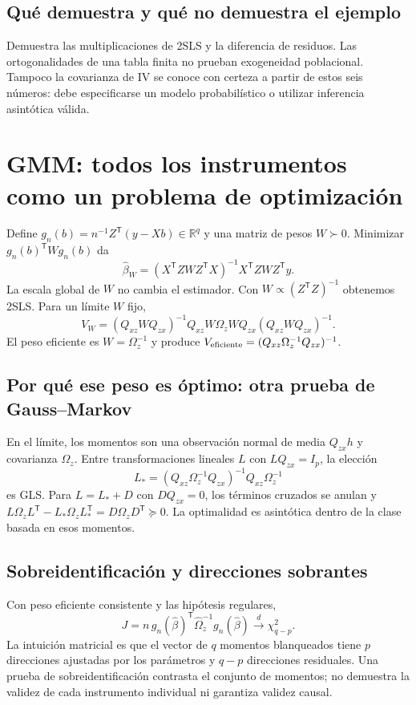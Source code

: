 \documentclass[11pt,a4paper]{article}
\newcommand{\R}{\mathbb R}
\newcommand{\T}{^{\mathsf T}}
\theoremstyle{definition}
\begin{document}
\subsection{Qué demuestra y qué no demuestra el ejemplo}
Demuestra las multiplicaciones de 2SLS y la diferencia de residuos. Las ortogonalidades de una tabla finita no prueban exogeneidad poblacional. Tampoco la covarianza de IV se conoce con certeza a partir de estos seis números: debe especificarse un modelo probabilístico o utilizar inferencia asintótica válida.

\section{GMM: todos los instrumentos como un problema de optimización}
Define $g_n(b)=n^{-1}Z\T(y-Xb)\in\R^q$ y una matriz de pesos $W\succ0$. Minimizar $g_n(b)\T Wg_n(b)$ da
\[
\widehat\beta_W=(X\T ZWZ\T X)^{-1}X\T ZWZ\T y.
\]
La escala global de $W$ no cambia el estimador. Con $W\propto(Z\T Z)^{-1}$ obtenemos 2SLS. Para un límite $W$ fijo,
\[
V_W=(Q_{xz}WQ_{zx})^{-1}Q_{xz}W\Omega_zWQ_{zx}(Q_{xz}WQ_{zx})^{-1}.
\]
El peso eficiente es $W=\Omega_z^{-1}$ y produce $V_{\rm eficiente}=(Q_{xz}\Omega_z^{-1}Q_{zx})^{-1}$.
\subsection{Por qué ese peso es óptimo: otra prueba de Gauss--Markov}
En el límite, los momentos son una observación normal de media $Q_{zx}h$ y covarianza $\Omega_z$. Entre transformaciones lineales $L$ con $LQ_{zx}=I_p$, la elección
\[
L_*=(Q_{xz}\Omega_z^{-1}Q_{zx})^{-1}Q_{xz}\Omega_z^{-1}
\]
es GLS. Para $L=L_*+D$ con $DQ_{zx}=0$, los términos cruzados se anulan y $L\Omega_zL\T-L_*\Omega_zL_*\T=D\Omega_zD\T\succeq0$. La optimalidad es asintótica dentro de la clase basada en esos momentos.
\subsection{Sobreidentificación y direcciones sobrantes}
Con peso eficiente consistente y las hipótesis regulares,
\[
J=n\,g_n(\widehat\beta)\T\widehat\Omega_z^{-1}g_n(\widehat\beta)
\xrightarrow d\chi^2_{q-p}.
\]
La intuición matricial es que el vector de $q$ momentos blanqueados tiene $p$ direcciones ajustadas por los parámetros y $q-p$ direcciones residuales. Una prueba de sobreidentificación contrasta el conjunto de momentos; no demuestra la validez de cada instrumento individual ni garantiza validez causal.
\end{document}
